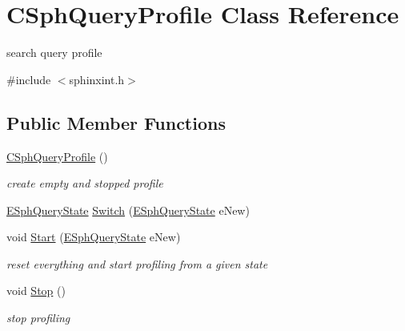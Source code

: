 \hypertarget{classCSphQueryProfile}{\section{C\-Sph\-Query\-Profile Class Reference}
\label{classCSphQueryProfile}
}


search query profile  




{\ttfamily \#include $<$sphinxint.\-h$>$}

\subsection*{Public Member Functions}
\begin{DoxyCompactItemize}
\item 
\hyperlink{classCSphQueryProfile_a0497fe1687f808e073bddad7f827aae0}{C\-Sph\-Query\-Profile} ()
\begin{DoxyCompactList}\small\item\em create empty and stopped profile \end{DoxyCompactList}\item 
\hyperlink{sphinxint_8h_a917e3d03a8db1617916e74f4d4078c06}{E\-Sph\-Query\-State} \hyperlink{classCSphQueryProfile_a7ee3ca174f6ba8970feea0ae387de323}{Switch} (\hyperlink{sphinxint_8h_a917e3d03a8db1617916e74f4d4078c06}{E\-Sph\-Query\-State} e\-New)
\item 
void \hyperlink{classCSphQueryProfile_a2bccb0cb9cd2d9ff060f21529a9ab6de}{Start} (\hyperlink{sphinxint_8h_a917e3d03a8db1617916e74f4d4078c06}{E\-Sph\-Query\-State} e\-New)
\begin{DoxyCompactList}\small\item\em reset everything and start profiling from a given state \end{DoxyCompactList}\item 
void \hyperlink{classCSphQueryProfile_a80650953b71884bcb1e03a8e23054cbd}{Stop} ()
\begin{DoxyCompactList}\small\item\em stop profiling \end{DoxyCompactList}\end{DoxyCompactItemize}
